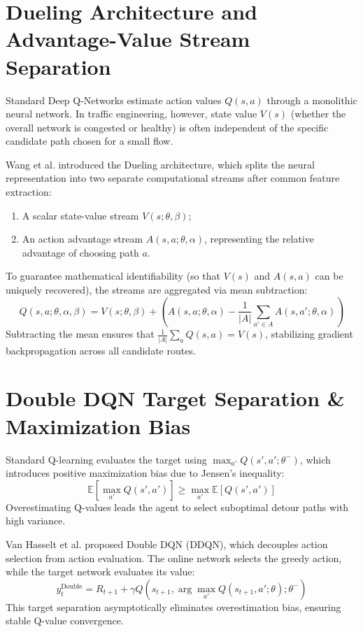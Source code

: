 \documentclass[12pt,a4paper,oneside]{report}
\begin{document}
\section{Dueling Architecture and Advantage-Value Stream Separation}
Standard Deep Q-Networks estimate action values $Q(s, a)$ through a monolithic neural network. In traffic engineering, however, state value $V(s)$ (whether the overall network is congested or healthy) is often independent of the specific candidate path chosen for a small flow.

Wang et al. \cite{wang2016dueling} introduced the Dueling architecture, which splits the neural representation into two separate computational streams after common feature extraction:
\begin{enumerate}
  \item A scalar state-value stream $V(s; \theta, \beta)$;
  \item An action advantage stream $A(s, a; \theta, \alpha)$, representing the relative advantage of choosing path $a$.
\end{enumerate}
To guarantee mathematical identifiability (so that $V(s)$ and $A(s, a)$ can be uniquely recovered), the streams are aggregated via mean subtraction:
\begin{equation}
Q(s, a; \theta, \alpha, \beta) = V(s; \theta, \beta) + \left( A(s, a; \theta, \alpha) - \frac{1}{|A|} \sum_{a' \in A} A(s, a'; \theta, \alpha) \right)
\label{eq:dueling_aggregation}
\end{equation}
Subtracting the mean ensures that $\frac{1}{|A|}\sum_a Q(s, a) = V(s)$, stabilizing gradient backpropagation across all candidate routes.

\section{Double DQN Target Separation \& Maximization Bias}
Standard Q-learning evaluates the target using $\max_{a'} Q(s', a'; \theta^-)$, which introduces positive maximization bias due to Jensen's inequality:
\begin{equation}
\mathbb{E}\left[\max_{a'} Q(s', a')\right] \ge \max_{a'} \mathbb{E}\left[Q(s', a')\right]
\end{equation}
Overestimating Q-values leads the agent to select suboptimal detour paths with high variance.

Van Hasselt et al. \cite{van2016deep} proposed Double DQN (DDQN), which decouples action selection from action evaluation. The online network selects the greedy action, while the target network evaluates its value:
\begin{equation}
y_t^{\mathrm{Double}} = R_{t+1} + \gamma Q\left(s_{t+1}, \arg\max_{a'} Q(s_{t+1}, a'; \theta); \theta^-\right)
\label{eq:double_dqn_target}
\end{equation}
This target separation asymptotically eliminates overestimation bias, ensuring stable Q-value convergence.
\end{document}
